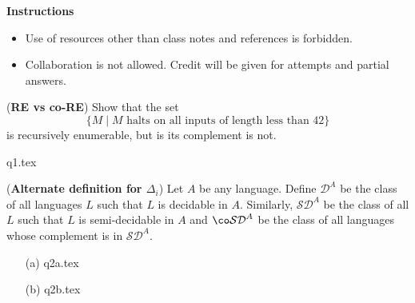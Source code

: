 \documentclass[12pt, a4paper,answers]{exam}
\renewcommand{\D}{\mathcal{D}}
\newcommand{\SD}{\mathcal{SD}}
\begin{document}
\textbf{Instructions}
\begin{itemize}   \setlength\itemsep{0.1mm}
	\item {\sf  Use of resources other than class notes and references is forbidden.}
	\item {\sf Collaboration is not allowed. Credit will be given for attempts and partial answers.}
\end{itemize}


\begin{questions}

\question[10] (\textbf{RE vs co-RE}) Show that the set \[ \{M \mid M \text{ halts on all inputs of length less than $42$}\}\] is recursively enumerable, but is its complement is not.

\begin{solution}
	{q1.tex}
\end{solution}

	\question[10] (\textbf{Alternate definition for $\Delta_i$}) Let $A$ be any language. Define $\D^A$ be the class of all languages $L$ such that $L$ is decidable in $A$. Similarly, $\SD^A$ be the class of all $L$ such that $L$ is semi-decidable in $A$ and $\co\SD^A $ be the class of all languages whose complement is in $\SD^A$.
	

\begin{solution}
	\begin{enumerate}
		\item[(a)] {q2a.tex}
		\item[(b)] {q2b.tex}
	\end{enumerate}
\end{solution}



\end{questions}
\end{document}
